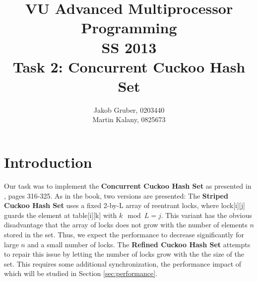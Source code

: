 \documentclass[a4paper,10pt]{article}
\title{VU Advanced Multiprocessor Programming \\
       SS 2013 \\
       Task 2: Concurrent Cuckoo Hash Set}
\author{Jakob Gruber, 0203440 \\
        Martin Kalany, 0825673}
\begin{document}
\maketitle

\begin{comment}
* Good theoretical analysis (invariants, linearizability, progress guarantees).
* Good benchmark analysis.
* Short document: 2-4 pages excluding plots and sourcecode. Description of data
  structure. Theoretical analysis. Benchmark (results, process).

+The Go implementation doesn't need either of these crutches. It's also designed
+to work without reentrant locks and thread ids.
\end{comment}

\section{Introduction}
Our task was to implement the \textbf{Concurrent Cuckoo Hash Set} as presented in \cite{herlihy}, pages 316-325. 
\newline 
As in the book, two versions are presented: The \textbf{Striped Cuckoo Hash Set} uses a fixed 2-by-L array of reentrant locks, where lock[i][j] guards the element at table[i][k] with $k\mod L = j$. This variant has the obvious disadvantage that the array of locks does not grow with the number of elements $n$ stored in the set. Thus, we expect the performance to decrease significantly for large $n$ and a small number of locks.
\newline
The \textbf{Refined Cuckoo Hash Set} attempts to repair this issue by letting the number of locks grow with the the size of the set. This requires some additional synchronization, the performance impact of which will be studied in Section \ref{sec:performance}.
\end{document}
